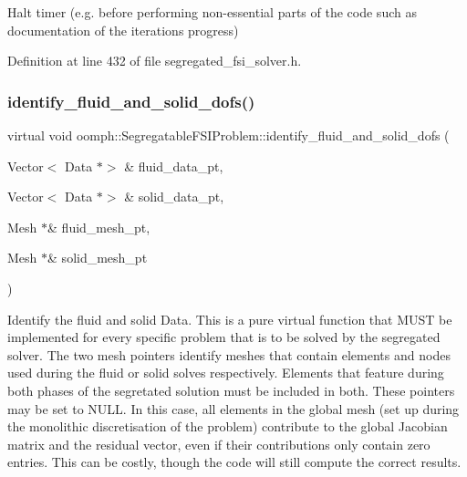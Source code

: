 Halt timer (e.\+g. before performing non-\/essential parts of the code such as documentation of the iteration\textquotesingle{}s progress) 



Definition at line 432 of file segregated\+\_\+fsi\+\_\+solver.\+h.

\mbox{\label{classoomph_1_1SegregatableFSIProblem_a60f719990547949019c8645a4b3a6c6e}} 
\subsubsection{\texorpdfstring{identify\+\_\+fluid\+\_\+and\+\_\+solid\+\_\+dofs()}{identify\_fluid\_and\_solid\_dofs()}}
{\footnotesize\ttfamily virtual void oomph\+::\+Segregatable\+F\+S\+I\+Problem\+::identify\+\_\+fluid\+\_\+and\+\_\+solid\+\_\+dofs (\begin{DoxyParamCaption}\item[{Vector$<$ Data $\ast$$>$ \&}]{fluid\+\_\+data\+\_\+pt,  }\item[{Vector$<$ Data $\ast$$>$ \&}]{solid\+\_\+data\+\_\+pt,  }\item[{Mesh $\ast$\&}]{fluid\+\_\+mesh\+\_\+pt,  }\item[{Mesh $\ast$\&}]{solid\+\_\+mesh\+\_\+pt }\end{DoxyParamCaption})\hspace{0.3cm}{\ttfamily [pure virtual]}}



Identify the fluid and solid Data. This is a pure virtual function that M\+U\+ST be implemented for every specific problem that is to be solved by the segregated solver. The two mesh pointers identify meshes that contain elements and nodes used during the fluid or solid solves respectively. Elements that feature during both phases of the segretated solution must be included in both. These pointers may be set to N\+U\+LL. In this case, all elements in the global mesh (set up during the monolithic discretisation of the problem) contribute to the global Jacobian matrix and the residual vector, even if their contributions only contain zero entries. This can be costly, though the code will still compute the correct results. 



